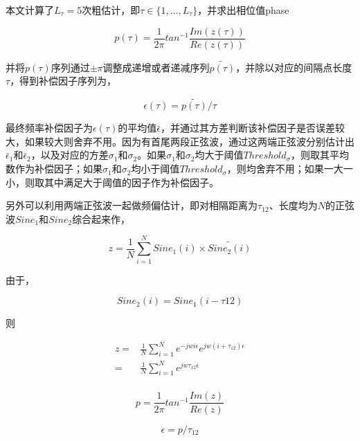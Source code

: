 本文计算了$L_{\tau} = 5$次粗估计，即$\tau \in \{1,..., L_{\tau}\}$，并求出相位值phase

\begin{equation}
    p(\tau) = \frac{1}{2\pi} tan^{-1} {\frac{Im(z(\tau))}{Re(z(\tau))}}
\end{equation}

并将$p(\tau)$序列通过$\pm \pi$调整成递增或者递减序列$\tilde{p(\tau)}$，并除以对应的间隔点长度$\tau$，得到补偿因子序列为，

\begin{equation}
    \epsilon(\tau) = \tilde{p(\tau)} / \tau
\end{equation}

最终频率补偿因子为$\epsilon(\tau)$的平均值$\bar{\epsilon}$，并通过其方差判断该补偿因子是否误差较大，如果较大则舍弃不用。因为有首尾两段正弦波，通过这两端正弦波分别估计出$\bar{\epsilon}_1$和$\bar{\epsilon}_2$，以及对应的方差$\sigma_1$和$\sigma_2$。如果$\sigma_1$和$\sigma_2$均大于阈值$Threshold_{\sigma}$，则取其平均数作为补偿因子；如果$\sigma_1$和$\sigma_2$均小于阈值$Threshold_\sigma$，则均舍弃不用；如果一大一小，则取其中满足大于阈值的因子作为补偿因子。

另外可以利用两端正弦波一起做频偏估计，即对相隔距离为$\tau_{12}$、长度均为$N$的正弦波$Sine_1$和$Sine_2$综合起来作，

\begin{equation}
    z = \frac{1}{N} \sum_{i=1}^N Sine_1(i) \times \tilde{Sine_2(i)}
\end{equation}

由于，

\begin{equation}
    Sine_2(i) = Sine_1(i - \tau{12})
\end{equation}

则

\begin{align}
    z = & \frac{1}{N} \sum_{i=1}^N e^{-jwi\epsilon} e^{jw(i+\tau_{12})\epsilon} \\
      = & \frac{1}{N} \sum_{i=1}^N e^{jw\tau_{12}\epsilon} \\
\end{align}

\begin{equation}
    p = \frac{1}{2\pi} tan^{-1} \frac{Im(z)}{Re(z)} 
\end{equation}

\begin{equation}
    \epsilon = p / \tau_{12}
\end{equation}


